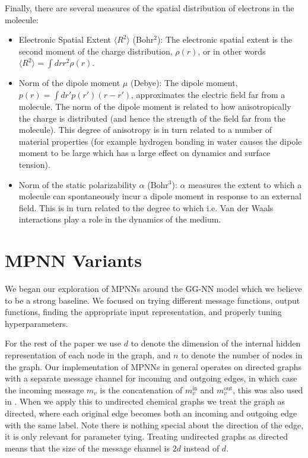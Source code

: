 \documentclass{article}
\begin{document}
Finally, there are several measures of the spatial distribution of electrons in the molecule:
\begin{itemize}
    \item Electronic Spatial Extent $\langle R^2\rangle$ (Bohr$^2$): The electronic spatial extent is the second moment of the charge distribution, $\rho(r)$, or in other words $\langle R^2\rangle = \int dr r^2\rho(r)$.
    \item Norm of the dipole moment $\mu$ (Debye): The dipole moment, $p(r) = \int dr'p(r')(r-r')$, approximates the electric field far from a molecule. The norm of the dipole moment is related to how anisotropically the charge is distributed (and hence the strength of the field far from the molecule). This degree of anisotropy is in turn related to a number of material properties (for example hydrogen bonding in water causes the dipole moment to be large which has a large effect on dynamics and surface tension).
    \item Norm of the static polarizability $\alpha$ (Bohr$^3$): $\alpha$ measures the extent to which a molecule can spontaneously incur a dipole moment in response to an external field. This is in turn related to the degree to which i.e. Van der Waals interactions play a role in the dynamics of the medium. 
\end{itemize}
\fi





\section{MPNN Variants} \label{sec:ggnn}

We began our exploration of MPNNs around the GG-NN model which we believe to be a strong baseline. We focused on trying different message functions, output functions, finding the appropriate input representation, and properly tuning hyperparameters.

For the rest of the paper we use $d$ to denote the dimension of the internal hidden representation of each node in the graph, and $n$ to denote the number of nodes in the graph. Our implementation of MPNNs in general operates on directed graphs with a separate message channel for incoming and outgoing edges, in which case the incoming message $m_v$ is the concatenation of $m_v^{\textrm{in}}$ and $m_v^{\textrm{out}}$, this was also used in \citet{yujia}. When we apply this to undirected chemical graphs we treat the graph as directed, where each original edge becomes both an incoming and outgoing edge with the same label. Note there is nothing special about the direction of the edge, it is only relevant for parameter tying. Treating undirected graphs as directed means that the size of the message channel is $2d$ instead of $d$. 
\end{document}
